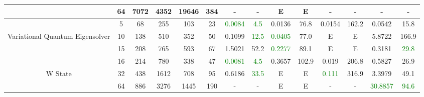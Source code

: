 \begin{table}[htb]
{\begin{tabular}{|c|c|c|c|c|c|c|c|c|c|c|c|c|c|}
 & 
64 & 7072 & 4352 & 19646 & 384
 & - & -
 & E & E
 & - & -
 & - & -
 \\
\hline
 & 
5 & 68 & 255 & 103 & 23
 & \textcolor{green}{0.0084} & \textcolor{green}{4.5}
 & 0.0136 & 76.8
 & 0.0154 & 162.2
 & 0.0542 & 15.8
 \\
Variational Quantum Eigensolver & 
10 & 138 & 510 & 352 & 50
 & 0.1099 & \textcolor{green}{12.5}
 & \textcolor{green}{0.0405} & 77.0
 & E & E
 & 5.8722 & 166.9
 \\
 & 
15 & 208 & 765 & 593 & 67
 & 1.5021 & 52.2
 & \textcolor{green}{0.2277} & 89.1
 & E & E
 & 0.3181 & \textcolor{green}{29.8}
 \\
\hline
 & 
16 & 214 & 780 & 338 & 47
 & \textcolor{green}{0.0081} & \textcolor{green}{4.5}
 & 0.3657 & 102.9
 & 0.019 & 206.8
 & 0.5827 & 26.9
 \\
W State & 
32 & 438 & 1612 & 708 & 95
 & 0.6186 & \textcolor{green}{33.5}
 & E & E
 & \textcolor{green}{0.111} & 316.9
 & 3.3979 & 49.1
 \\
 & 
64 & 886 & 3276 & 1445 & 190
 & - & -
 & E & E
 & - & -
 & \textcolor{green}{30.8857} & \textcolor{green}{94.6}
 \\
\hline
\end{tabular}}
\end{table}
